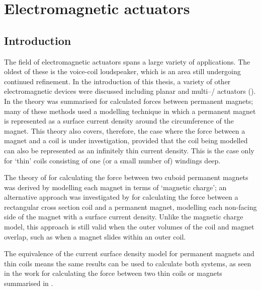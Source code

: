 \documentclass[11pt,a4paper]{memoir}
\begin{document}
\chapter{Electromagnetic actuators}


\section{Introduction}

The field of electromagnetic actuators spans a large variety of applications.
The oldest of these is the voice-coil loudspeaker, which is an area still undergoing continued refinement.
In the introduction of this thesis, a variety of other electromagnetic devices were discussed including planar and multi--\dof/ actuators ().
In  the theory was summarised for calculated forces between permanent magnets; many of these methods used a modelling technique in which a permanent magnet is represented as a surface current density around the circumference of the magnet.
This theory also covers, therefore, the case where the force between a magnet and a coil is under investigation, provided that the coil being modelled can also be represented as an infinitely thin current density.
This is the case only for `thin' coils consisting of one (or a small number of) windings deep.

The theory of \textcite{akoun1984} for calculating the force between two cuboid permanent magnets was derived by modelling each magnet in terms of `magnetic charge'; an alternative approach was investigated by \textcite{rovers2010-ietm} for calculating the force between a rectangular cross section coil and a permanent magnet, modelling each non-facing side of the magnet with a surface current density.
Unlike the magnetic charge model, this approach is still valid when the outer volumes of the coil and magnet overlap, such as when a magnet slides within an outer coil.

The equivalence of the current surface density model for permanent magnets and thin coils means the same results can be used to calculate both systems, as seen in the work for calculating the force between two thin coils or magnets \cite{babic2008-ietm,ravaud2010-ietm,robertson2011-ietm} summarised in .
\end{document}
